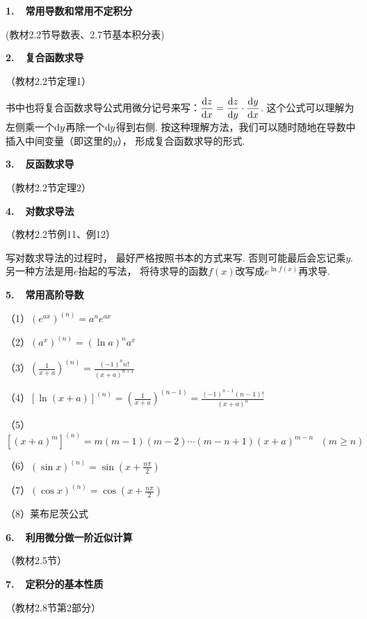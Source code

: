 \textbf{1.~~常用导数和常用不定积分}

(教材2.2节导数表、2.7节基本积分表)\vspace{0.5em}

\textbf{2.~~复合函数求导}

（教材2.2节定理1）

书中也将复合函数求导公式用微分记号来写：$\displaystyle\frac{\mathrm{d} z}{\mathrm{d} x}= \displaystyle\frac{\mathrm{d} z}{\mathrm{d} y}\cdot \displaystyle
\frac{\mathrm{d} y}{\mathrm{d} x}$. 这个公式可以理解为左侧乘一个$\mathrm{d} y$再除一个$\mathrm{d} y$得到右侧. 按这种理解方法，我们可以随时随地在导数中插入中间变量（即这里的$y$），
形成复合函数求导的形式.\vspace{0.5em}

\textbf{3.~~反函数求导}

（教材2.2节定理2）\vspace{0.5em}

\textbf{4.~~对数求导法}

（教材2.2节例11、例12）

写对数求导法的过程时，
最好严格按照书本的方式来写.
否则可能最后会忘记乘$y$.
另一种方法是用$e$抬起的写法，
将待求导的函数$f(x)$改写成$e^{\ln f(x)}$再求导.\vspace{0.5em}


\textbf{5.~~常用高阶导数}

（1）$(e^{ax})^{(n)} = a^{n}e^{ax}$

（2）$(a^{x})^{(n)} = (\ln a)^{n}a^{x}$

（3）$\left(\displaystyle\frac{1}{x+a} \right)^{(n)} = \displaystyle\frac{(-1)^{n}n!}{(x+a)^{n+1}}$

（4）$[\ln (x+a)]^{(n)} = \left(\displaystyle\frac{1}{x+a} \right)^{(n-1)} = \displaystyle\frac{(-1)^{n-1}(n-1)!}{(x+a)^{n}}$

（5）$[(x+a)^{m}]^{(n)} = m(m-1)(m-2)\cdots (m-n+1)(x+a)^{m-n}~~~(m \ge n)$

（6）$(\sin x)^{(n)} = \sin (x + \displaystyle\frac{n\pi}{2})$

（7）$(\cos x)^{(n)} = \cos (x + \displaystyle\frac{n\pi}{2})$

（8）莱布尼茨公式 \vspace{0.75em}

\textbf{6.~~利用微分做一阶近似计算}

（教材2.5节）\vspace{0.5em}

\textbf{7.~~定积分的基本性质}

（教材2.8节第2部分）

